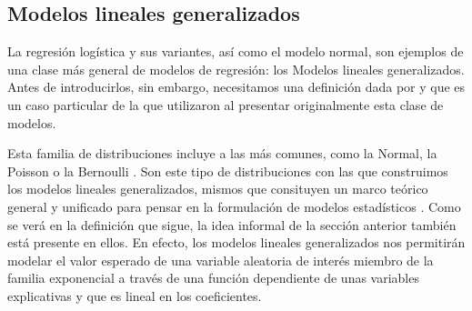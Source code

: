 \subsection{Modelos lineales generalizados}

La regresión logística y sus variantes, así como el modelo normal, son  ejemplos de una clase más general de modelos de regresión: los Modelos lineales generalizados. Antes de introducirlos, sin embargo, necesitamos una definición dada por \textcite[51]{Nieto16} y que es un caso particular de la que utilizaron \textcite[371]{NelderWedderburn72} al presentar originalmente esta clase de modelos. 


Esta familia de distribuciones incluye a las más comunes, como la Normal, la Poisson o la Bernoulli \parencite[52-53]{Nieto16}. Son este tipo de distribuciones con las que construimos los modelos lineales generalizados, mismos que consituyen un marco teórico general y unificado para pensar en la formulación de modelos estadísticos \parencites{Dobson01}{Regueiro12}. Como se verá en la definición que sigue, la idea informal de la sección anterior también está presente en ellos. En efecto, los modelos lineales generalizados nos permitirán modelar el valor esperado de una variable aleatoria de interés miembro de la familia exponencial a través de una función dependiente de unas variables explicativas y que es lineal en los coeficientes.

